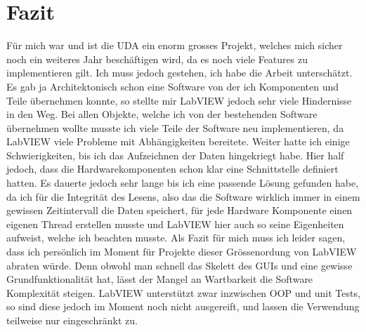 \documentclass[10pt]{scrartcl}
\begin{document}
\section{Fazit}
Für mich war und ist die UDA ein enorm grosses Projekt, welches mich sicher noch ein weiteres Jahr beschäftigen wird, da es noch viele Features zu implementieren gilt. Ich muss jedoch gestehen, ich habe die Arbeit unterschätzt. Es gab ja Architektonisch schon eine Software von der ich Komponenten und Teile übernehmen konnte, so stellte mir \gls{LabVIEW} jedoch sehr viele Hindernisse in den Weg. Bei allen Objekte, welche ich von der bestehenden Software übernehmen wollte musste ich viele Teile der Software neu implementieren, da \gls{LabVIEW} viele Probleme mit Abhängigkeiten bereitete. Weiter hatte ich einige Schwierigkeiten, bis ich das Aufzeichnen der Daten hingekriegt habe. Hier half jedoch, dass die Hardwarekomponenten schon klar eine Schnittstelle definiert hatten. Es dauerte jedoch sehr lange bis ich eine passende Lösung gefunden habe, da ich für die Integrität des Lesens, also das die Software wirklich immer in einem gewissen Zeitintervall die Daten speichert, für jede Hardware Komponente einen eigenen Thread erstellen musste und \gls{LabVIEW} hier auch so seine Eigenheiten aufweist, welche ich beachten musste. Als Fazit für mich muss ich leider sagen, dass ich persönlich im Moment für Projekte dieser Grössenordung von \gls{LabVIEW} abraten würde. Denn obwohl man schnell das Skelett des GUIs und eine gewisse Grundfunktionalität hat, lässt der Mangel an Wartbarkeit die Software Komplexität steigen. \gls{LabVIEW} unterstützt zwar inzwischen OOP und unit Tests, so sind diese jedoch im Moment noch nicht ausgereift, und lassen die Verwendung teilweise nur eingeschränkt zu.
\end{document}

